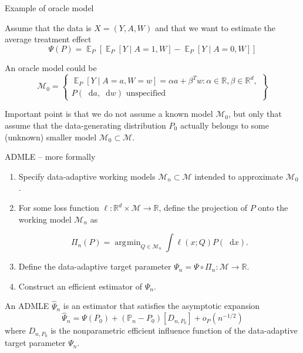 \documentclass[smaller]{beamer}\usepackage{listings}
\newcommand{\E}{{\ensuremath{\mathop{{\mathbb{E}}}}}}
\newcommand{\R}{\mathbb{R}}
\newcommand*\diff{\mathop{}\!\mathrm{d}}
\newcommand\smallO{\textit{o}}
\newcommand{\1}{\mathds{1}}
\DeclareMathOperator*{\argmin}{\arg\!\min}
\newcommand{\empmeas}{\ensuremath{\mathbb{P}_n}} %
\begin{document}
\begin{frame}[label={sec:org5495f19}]{Example of oracle model}

Assume that the data is \( X = (Y, A, W) \) and that we want to estimate the
average treatment effect
\begin{equation*}
  \Psi(P) = \E_P{\left[ \E_P{\left[Y \mid A=1, W \right]} - \E_P{\left[Y \mid A=0, W \right]} \right]}
\end{equation*}

\vfill

An oracle model could be
\begin{equation*}
  \mathcal{M}_0 =
  \begin{Bmatrix}
          \E_P{\left[Y \mid A=a, W=w \right]}
    = \alpha a + \beta^T w
    : \alpha \in \R, \beta \in \R^d,
     \\
    P(\diff a, \diff w) \text{ unspecified}
  \end{Bmatrix}
\end{equation*}

\vfill

Important point is that we do not assume a known model \( \mathcal{M}_0 \),
but only that assume that the data-generating distribution \( P_0 \) actually
belongs to some (unknown) smaller model
\( \mathcal{M}_0 \subset \mathcal{M} \).
\end{frame}


\begin{frame}[label={sec:orgf97d019}]{ADMLE -- more formally}
\begin{enumerate}
\item Specify data-adaptive working models \(\mathcal{M}_n \subset \mathcal{M}\)
intended to approximate \(\mathcal{M}_0\).
\item For some loss function \(\ell \colon \R^d \times \mathcal{M} \rightarrow \R\), define the projection of \(P\) onto the working model \(\mathcal{M}_n\) as

\begin{equation*}
  \Pi_n(P) = \argmin_{Q \in \mathcal{M}_n}\int \ell(x; Q) P(\diff x).
\end{equation*}
\item Define the data-adaptive target parameter \(\Psi_n = \Psi \circ \Pi_n \colon
   \mathcal{M} \rightarrow \R\).
\item Construct an efficient estimator of \(\Psi_n\).
\end{enumerate}

\vfill

An ADMLE \( \hat{\Psi}_n \) is an estimator that satisfies the asymptotic
expansion
\begin{equation*}
  \hat{\Psi}_n  =  \Psi(P_0) + (\empmeas - P_0){[D_{n,P_0}]} + \smallO_P{(n^{-1/2})}
\end{equation*}
where \( D_{n,P_0} \) is the nonparametric efficient influence function of the
data-adaptive target parameter $\Psi_n$.
\end{frame}
\end{document}
